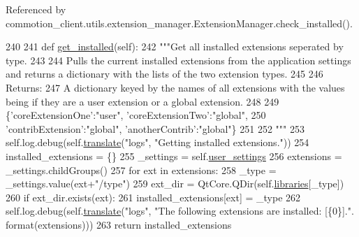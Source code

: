 Referenced by commotion\-\_\-client.\-utils.\-extension\-\_\-manager.\-Extension\-Manager.\-check\-\_\-installed().


\begin{DoxyCode}
240 
241     \textcolor{keyword}{def }\hyperlink{classcommotion__client_1_1utils_1_1extension__manager_1_1ExtensionManager_aa2b5054f6495fbc20e556f5713550d01}{get\_installed}(self):
242         \textcolor{stringliteral}{"""Get all installed extensions seperated by type.}
243 \textcolor{stringliteral}{}
244 \textcolor{stringliteral}{        Pulls the current installed extensions from the application settings and returns a dictionary with
       the lists of the two extension types.}
245 \textcolor{stringliteral}{}
246 \textcolor{stringliteral}{        Returns:}
247 \textcolor{stringliteral}{          A dictionary keyed by the names of all extensions with the values being if they are a user
       extension or a global extension.}
248 \textcolor{stringliteral}{}
249 \textcolor{stringliteral}{          \{'coreExtensionOne':"user", 'coreExtensionTwo':"global",}
250 \textcolor{stringliteral}{           'contribExtension':"global", 'anotherContrib':"global"\}}
251 \textcolor{stringliteral}{}
252 \textcolor{stringliteral}{        """}
253         self.log.debug(self.\hyperlink{classcommotion__client_1_1utils_1_1extension__manager_1_1ExtensionManager_a2cfd032ca383c3fd6f0f52b99b6dd67c}{translate}(\textcolor{stringliteral}{"logs"}, \textcolor{stringliteral}{"Getting installed extensions."}))
254         installed\_extensions = \{\}
255         \_settings = self.\hyperlink{classcommotion__client_1_1utils_1_1extension__manager_1_1ExtensionManager_a0fa8b2be1171ded73629a01c50472d34}{user\_settings}
256         extensions = \_settings.childGroups()
257         \textcolor{keywordflow}{for} ext \textcolor{keywordflow}{in} extensions:
258             \_type = \_settings.value(ext+\textcolor{stringliteral}{"/type"})
259             ext\_dir = QtCore.QDir(self.\hyperlink{classcommotion__client_1_1utils_1_1extension__manager_1_1ExtensionManager_a28e035496b4d544179f934b3c401c0c1}{libraries}[\_type])
260             \textcolor{keywordflow}{if} ext\_dir.exists(ext):
261                 installed\_extensions[ext] = \_type
262         self.log.debug(self.\hyperlink{classcommotion__client_1_1utils_1_1extension__manager_1_1ExtensionManager_a2cfd032ca383c3fd6f0f52b99b6dd67c}{translate}(\textcolor{stringliteral}{"logs"}, \textcolor{stringliteral}{"The following extensions are installed: [\{0\}]."}.
      format(extensions)))
263         \textcolor{keywordflow}{return} installed\_extensions
            
\end{DoxyCode}
